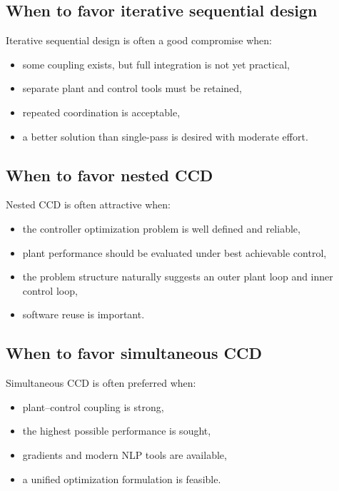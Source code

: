 \documentclass[11pt]{article}
\begin{document}
\subsection{When to favor iterative sequential design}

Iterative sequential design is often a good compromise when:
\begin{itemize}[leftmargin=1.4em]
  \item some coupling exists, but full integration is not yet practical,
  \item separate plant and control tools must be retained,
  \item repeated coordination is acceptable,
  \item a better solution than single-pass is desired with moderate effort.
\end{itemize}

\subsection{When to favor nested CCD}

Nested CCD is often attractive when:
\begin{itemize}[leftmargin=1.4em]
  \item the controller optimization problem is well defined and reliable,
  \item plant performance should be evaluated under best achievable control,
  \item the problem structure naturally suggests an outer plant loop and inner control loop,
  \item software reuse is important.
\end{itemize}

\subsection{When to favor simultaneous CCD}

Simultaneous CCD is often preferred when:
\begin{itemize}[leftmargin=1.4em]
  \item plant--control coupling is strong,
  \item the highest possible performance is sought,
  \item gradients and modern NLP tools are available,
  \item a unified optimization formulation is feasible.
\end{itemize}
\end{document}
